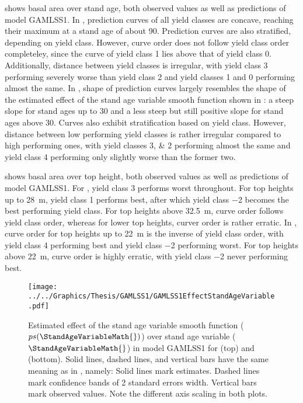  shows basal area over stand age, both observed values as well as predictions of model GAMLSS1.  In \Beech{}, prediction curves of all yield classes are concave, reaching their maximum at a stand age of about \SI{90}{\year}.  Prediction curves are also stratified, depending on yield class.  However, curve order does not follow yield class order completeley, since the curve of yield class \num{1} lies above that of yield class \num{0}.  Additionally, distance between yield classes is irregular, with yield class \num{3} performing severely worse than yield class \num{2} and yield classes \num{1} and \num{0} performing almost the same.  In \Spruce{}, shape of prediction curves largely resembles the shape of the estimated effect of the stand age variable smooth function shown in :  a steep slope for stand ages up to \SI{30}{\year} and a less steep but still positive slope for stand ages above \SI{30}{\year}.  Curves also exhibit stratification based on yield class.  However, distance between low performing yield classes is rather irregular compared to high performing ones, with yield classes \numlist{3;2} performing almost the same and yield class \num{4} performing only slightly worse than the former two.

 shows basal area over top height, both observed values as well as predictions of model GAMLSS1.  For \Beech{}, yield class \num{3} performs worst throughout.  For top heights up to \SI{28}{\meter}, yield class \num{1} performs best, after which yield class \num{-2} becomes the best performing yield class.  For top heights above \SI{32.5}{\meter}, curve order follows yield class order, whereas for lower top heights, curver order is rather erratic.  In \Spruce{}, curve order for top heights up to \SI{22}{\meter} is the inverse of yield class order, with yield class \num{4} performing best and yield class \num{-2} performing worst.  For top heights above \SI{22}{\meter}, curve order is highly erratic, with yield class \num{-2} never performing best.

\begin{figure}[h]
  \centering
  \texttt{[image: ../../Graphics/Thesis/GAMLSS1/GAMLSS1EffectStandAgeVariable.pdf]}
  \caption{Estimated effect of the stand age variable smooth function (\(ps(\StandAgeVariableMath{})\)) over stand age variable (\(\StandAgeVariableMath{}\)) in model GAMLSS1 for \Beech{} (top) and \Spruce{} (bottom).  Solid lines, dashed lines, and vertical bars have the same meaning as in , namely:  Solid lines mark estimates.  Dashed lines mark confidence bands of 2 standard errors width.  Vertical bars mark observed values.  Note the different axis scaling in both plots.}
  \label{fig:GAMLSS1EffectStandAgeVariable}
\end{figure}

